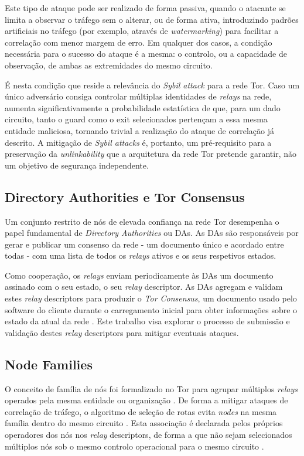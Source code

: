 Este tipo de ataque pode ser realizado de forma passiva, quando o atacante se limita a observar o tráfego sem o alterar, ou de forma ativa, introduzindo padrões artificiais no tráfego (por exemplo, através de \textit{watermarking}) para facilitar a correlação com menor margem de erro. Em qualquer dos casos, a condição necessária para o sucesso do ataque é a mesma: o controlo, ou a capacidade de observação, de ambas as extremidades do mesmo circuito.

É nesta condição que reside a relevância do \textit{Sybil attack} para a rede Tor. Caso um único adversário consiga controlar múltiplas identidades de \textit{relays} na rede, aumenta significativamente a probabilidade estatística de que, para um dado circuito, tanto o guard como o exit selecionados pertençam a essa mesma entidade maliciosa, tornando trivial a realização do ataque de correlação já descrito. A mitigação de \textit{Sybil attacks} é, portanto, um pré-requisito para a preservação da \textit{unlinkability} que a arquitetura da rede Tor pretende garantir, não um objetivo de segurança independente.

\subsection{Directory Authorities e Tor Consensus}

Um conjunto restrito de nós de elevada confiança na rede Tor desempenha o papel fundamental de \textit{Directory Authorities} ou DAs. As DAs são responsáveis por gerar e publicar um consenso da rede - um documento único e acordado entre todas - com uma lista de todos os \textit{relays} ativos e os seus respetivos estados.

Como cooperação, os \textit{relays} enviam periodicamente às DAs um documento assinado com o seu estado, o seu \textit{relay} descriptor. As DAs agregam e validam estes \textit{relay} descriptors para produzir o \textit{Tor Consensus}, um documento usado pelo software do cliente durante o carregamento inicial para obter informações sobre o estado da atual da rede \cite{dingledine2004tor}. Este trabalho visa explorar o processo de submissão e validação destes \textit{relay} descriptors para mitigar eventuais ataques.

\subsection{Node Families}

O conceito de família de nós foi formalizado no Tor para agrupar múltiplos \textit{relays} operados pela mesma entidade ou organização \cite{dingledine2004tor}. De forma a mitigar ataques de correlação de tráfego, o algoritmo de seleção de rotas evita \textit{nodes} na mesma família dentro do mesmo circuito \cite{wang2013empirical}. Esta associação é declarada pelos próprios operadores dos nós nos \textit{relay} descriptors, de forma a que não sejam selecionados múltiplos nós sob o mesmo controlo operacional para o mesmo circuito \cite{tor_dirspec_serverdesc}.

